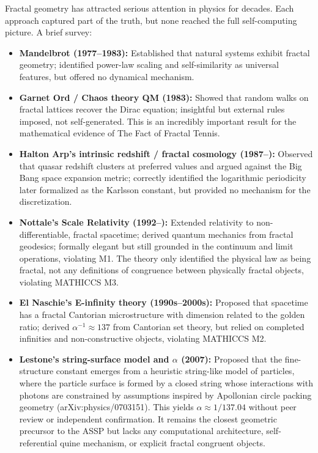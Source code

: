 \documentclass[11pt,a4paper]{article}
\begin{document}
Fractal geometry has attracted serious attention in physics for decades. Each
approach captured part of the truth, but none reached the full self-computing
picture. A brief survey:

\begin{itemize}
  \item \textbf{Mandelbrot (1977--1983):} Established that natural systems exhibit
        fractal geometry; identified power-law scaling and self-similarity as
        universal features, but offered no dynamical mechanism.

  \item \textbf{Garnet Ord / Chaos theory QM (1983):} Showed that random walks on
        fractal lattices recover the Dirac equation; insightful but external rules
        imposed, not self-generated. This is an incredibly important result for the
        mathematical evidence of The Fact of Fractal Tennis.

  \item \textbf{Halton Arp's intrinsic redshift / fractal cosmology (1987--):}
        Observed that quasar redshift clusters at preferred values and argued against
        the Big Bang space expansion metric; correctly identified the logarithmic
        periodicity later formalized as the Karlsson constant, but provided no
        mechanism for the discretization.

  \item \textbf{Nottale's Scale Relativity (1992--):} Extended relativity to
        non-differentiable, fractal spacetime; derived quantum mechanics from fractal
        geodesics; formally elegant but still grounded in the continuum and limit
        operations, violating M1. The theory only identified the physical law as
        being fractal, not any definitions of congruence between physically fractal
        objects, violating MATHICCS M3.

  \item \textbf{El Naschie's E-infinity theory (1990s--2000s):} Proposed that
        spacetime has a fractal Cantorian microstructure with dimension related to
        the golden ratio; derived $\alpha^{-1}\approx137$ from Cantorian set theory,
        but relied on completed infinities and non-constructive objects, violating
        MATHICCS M2.

  \item \textbf{Lestone's string-surface model and $\alpha$ (2007):} Proposed that
        the fine-structure constant emerges from a heuristic string-like model of
        particles, where the particle surface is formed by a closed string whose
        interactions with photons are constrained by assumptions inspired by
        Apollonian circle packing geometry (arXiv:physics/0703151). This yields
        $\alpha \approx 1/137.04$ without peer review or independent confirmation.
        It remains the closest geometric precursor to the ASSP but lacks any
        computational architecture, self-referential quine mechanism, or explicit
        fractal congruent objects.
\end{itemize}
\end{document}
